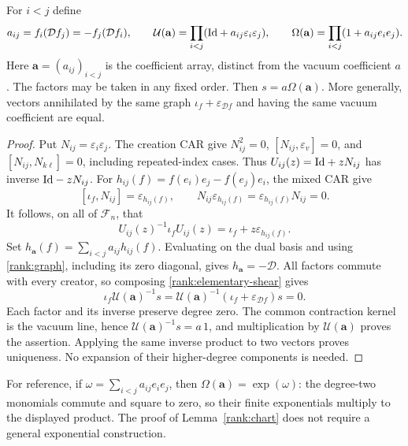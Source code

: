 \begin{lemma}\label{rank:chart}
For $i<j$ define
\[
 a_{ij}=f_i(\mathcal D f_j)=-f_j(\mathcal D f_i),\qquad
 \mathcal U(\mathbf a)=\prod_{i<j}(\mathrm{Id}+a_{ij}\varepsilon_i\varepsilon_j),
 \qquad
 \Omega(\mathbf a)=\prod_{i<j}(1+a_{ij}e_ie_j).
\]
Here $\mathbf a=(a_{ij})_{i<j}$ is the coefficient array, distinct from
the vacuum coefficient $a$. The factors may be taken in any fixed order.
Then $s=a\Omega(\mathbf a)$.
More generally, vectors annihilated by the same graph
$\iota_f+\varepsilon_{\mathcal D f}$ and having the same vacuum coefficient
are equal.
\end{lemma}
\begin{proof}
Put $N_{ij}=\varepsilon_i\varepsilon_j$. The creation CAR give
$N_{ij}^2=0$, $[N_{ij},\varepsilon_v]=0$, and
$[N_{ij},N_{k\ell}]=0$, including repeated-index cases.
Thus $U_{ij}(z)=\mathrm{Id}+zN_{ij}$ has inverse $\mathrm{Id}-zN_{ij}$.
For $h_{ij}(f)=f(e_i)e_j-f(e_j)e_i$, the mixed CAR give
\[
 [\iota_f,N_{ij}]=\varepsilon_{h_{ij}(f)},\qquad
 N_{ij}\varepsilon_{h_{ij}(f)}
 =\varepsilon_{h_{ij}(f)}N_{ij}=0.
\]
It follows, on all of $\mathcal F_n$, that
\begin{equation}
 U_{ij}(z)^{-1}\iota_fU_{ij}(z)
 =\iota_f+z\varepsilon_{h_{ij}(f)}.
 \label{rank:elementary-shear}
\end{equation}
Set $h_{\mathbf a}(f)=\sum_{i<j}a_{ij}h_{ij}(f)$.
Evaluating on the dual basis and using \eqref{rank:graph}, including its
zero diagonal, gives $h_{\mathbf a}=-\mathcal D$.
All factors commute with every creator, so composing
\eqref{rank:elementary-shear} gives
\[
 \iota_f\mathcal U(\mathbf a)^{-1}s
 =\mathcal U(\mathbf a)^{-1}(\iota_f+\varepsilon_{\mathcal D f})s=0.
\]
Each factor and its inverse preserve degree zero. The common contraction
kernel is the vacuum line, hence
$\mathcal U(\mathbf a)^{-1}s=a\,1$, and multiplication by
$\mathcal U(\mathbf a)$ proves
the assertion. Applying the same inverse product to two vectors proves
uniqueness. No expansion of their higher-degree components is needed.
\end{proof}

For reference, if $\omega=\sum_{i<j}a_{ij}e_ie_j$, then
$\Omega(\mathbf a)=\exp(\omega)$: the degree-two monomials commute and square to
zero, so their finite exponentials multiply to the displayed product.
The proof of Lemma~\ref{rank:chart} does not require a general exponential
construction.


